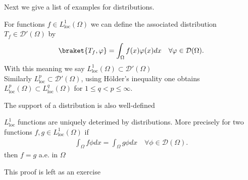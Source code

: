 Next we give a list of examples for distributions.
\begin{example}
  For functions $f \in  L^{1}_{\text{loc}}(\Omega ) $  we can define the associated distribution $T_f \in  \mathcal{D}'(\Omega )$ by 
  \begin{align*}
    \braket{T_f,\phi } = \int_\Omega  f(x)\phi(x) dx \quad \forall \phi  \in \mathcal{D}(\Omega )
  .\end{align*}
  With this meaning we say $L_{\text{loc}}^{1}(\Omega ) \subset \mathcal{D}'(\Omega )  $\\[1ex]
  Similarly $L^{p}_{\text{loc}} \subset  \mathcal{D}'(\Omega ) $, using Hölder's inequality one obtains
  $L_{\text{loc}}^{p}(\Omega ) \subset L_{\text{loc}}^{q}(\Omega )   $ for $1\leq q<p\leq \infty$.
\end{example}
\begin{remark}
 The support of a distribution is also well-defined 
\end{remark}
\begin{theorem}
  $L^{1}_{\text{loc}} $ functions are uniquely deterimed by distributions. More precisely 
  for two functions $f,g \in  L_{\text{loc}}^{1}(\Omega ) $  if 
  \begin{align*}
    \int_\Omega  f \phi dx = \int_\Omega  g \phi dx \quad \forall \phi  \in \mathcal{D}(\Omega )
  .\end{align*}
  then $f = g$ a.e. in $\Omega $
\end{theorem}
 This proof is left as an exercise  

